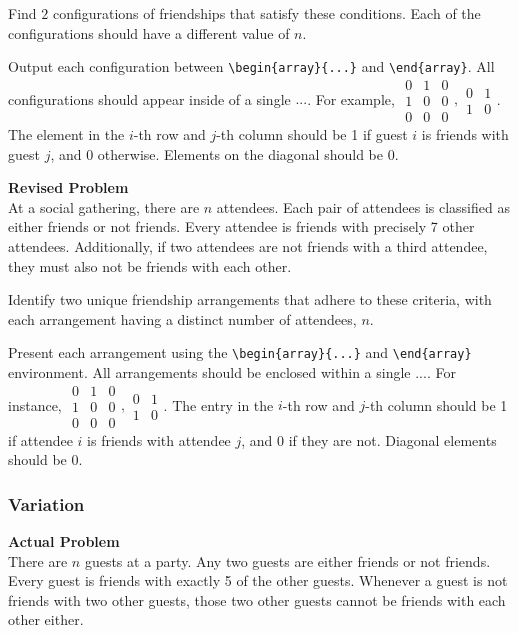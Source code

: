 Find $2$ configurations of friendships that satisfy these conditions. Each of the configurations should have a different value of $n$.

Output each configuration between \verb|\begin{array}{...}| and \verb|\end{array}|. All configurations should appear inside of a single $\boxed{...}$. For example, $\boxed{\begin{array}{ccc}0 & 1 & 0 \\ 1 & 0 & 0 \\ 0 & 0 & 0\end{array},\begin{array}{cc}0 & 1 \\ 1 & 0\end{array}}$.
The element in the $i$-th row and $j$-th column should be 1 if guest $i$ is friends with guest $j$, and 0 otherwise. Elements on the diagonal should be 0.

\textbf{Revised Problem}\\
At a social gathering, there are $n$ attendees. Each pair of attendees is classified as either friends or not friends. Every attendee is friends with precisely 7 other attendees. Additionally, if two attendees are not friends with a third attendee, they must also not be friends with each other.

Identify two unique friendship arrangements that adhere to these criteria, with each arrangement having a distinct number of attendees, $n$.

Present each arrangement using the \verb|\begin{array}{...}| and \verb|\end{array}| environment. All arrangements should be enclosed within a single $\boxed{...}$. For instance, $\boxed{\begin{array}{ccc}0 & 1 & 0 \\ 1 & 0 & 0 \\ 0 & 0 & 0\end{array},\begin{array}{cc}0 & 1 \\ 1 & 0\end{array}}$.
The entry in the $i$-th row and $j$-th column should be 1 if attendee $i$ is friends with attendee $j$, and 0 if they are not. Diagonal elements should be 0.

\subsubsection{Variation}
\textbf{Actual Problem}\\
There are $n$ guests at a party. Any two guests are either friends or not friends. Every guest is friends with exactly 5 of the other guests. Whenever a guest is not friends with two other guests, those two other guests cannot be friends with each other either.

